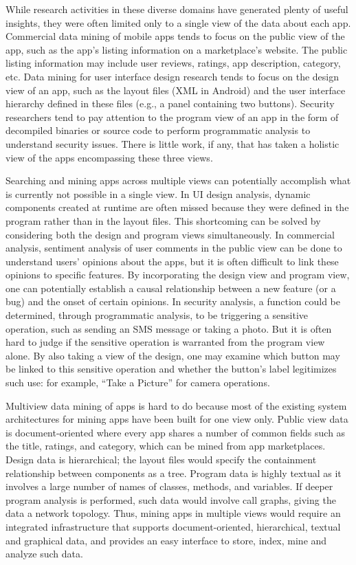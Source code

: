 While research activities in these diverse domains have generated plenty of useful insights, they were often limited only to a single view of the data about each app.
Commercial data mining of mobile apps tends to focus on the public view of the app, such as the app's listing information on a marketplace's website.
The public listing information may include user reviews, ratings, app description, category, etc.
Data mining for user interface design research tends to focus on the design view of an app, such as the layout files (XML in Android) and the user interface hierarchy defined in these files (e.g., a panel containing two buttons).
Security researchers tend to pay attention to the program view of an app in the form of decompiled binaries or source code to perform programmatic analysis to understand security issues.
There is little work, if any, that has taken a holistic view of the apps encompassing these three views.

Searching and mining apps across multiple views can potentially accomplish what is currently not possible in a single view.
In UI design analysis, dynamic components created at runtime are often missed because they were defined in the program rather than in the layout files.
This shortcoming can be solved by considering both the design and program views simultaneously.
In commercial analysis, sentiment analysis of user comments in the public view can be done to understand users' opinions about the apps, but it is often difficult to link these opinions to specific features.
By incorporating the design view and program view, one can potentially establish a causal relationship between a new feature (or a bug) and the onset of certain opinions.
In security analysis, a function could be determined, through programmatic analysis, to be triggering a sensitive operation, such as sending an SMS message or taking a photo.
But it is often hard to judge if the sensitive operation is warranted from the program view alone.
By also taking a view of the design, one may examine which button may be linked to this sensitive operation and whether the button's label legitimizes such use: for example, ``Take a Picture'' for camera operations.

Multiview data mining of apps is hard to do because most of the existing system architectures for mining apps have been built for one view only.
Public view data is document-oriented where every app shares a number of common fields such as the title, ratings, and category, which can be mined from app marketplaces.
Design data is hierarchical; the layout files would specify the containment relationship between components as a tree.
Program data is highly textual as it involves a large number of names of classes, methods, and variables.
If deeper program analysis is performed, such data would involve call graphs, giving the data a network topology.
Thus, mining apps in multiple views would require an integrated infrastructure that supports document-oriented, hierarchical, textual and graphical data, and provides an easy interface to store, index, mine and analyze such data.

